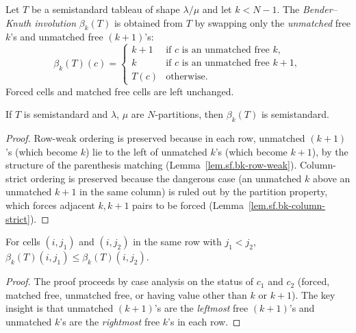 \begin{definition}
\label{def.sf.bk-involution}
\leanhelper
\leanok
Let $T$ be a semistandard tableau of shape $\lambda/\mu$ and let
$k < N-1$.  The \emph{Bender--Knuth involution} $\beta_k(T)$ is obtained
from $T$ by swapping only the \emph{unmatched} free $k$'s and
unmatched free $(k{+}1)$'s:
\[
  \beta_k(T)(c) = \begin{cases}
    k+1 & \text{if } c \text{ is an unmatched free } k, \\
    k   & \text{if } c \text{ is an unmatched free } k{+}1, \\
    T(c) & \text{otherwise.}
  \end{cases}
\]
Forced cells and matched free cells are left unchanged.
\end{definition}

\begin{lemma}
\label{lem.sf.bk-semistandard}
\leanhelper
\leanok
If $T$ is semistandard and $\lambda$, $\mu$ are $N$-partitions, then
$\beta_k(T)$ is semistandard.
\end{lemma}

\begin{proof}
\leanok
Row-weak ordering is preserved because in each row, unmatched $(k{+}1)$'s
(which become $k$) lie to the left of unmatched $k$'s (which become $k{+}1$),
by the structure of the parenthesis matching (Lemma~\ref{lem.sf.bk-row-weak}).
Column-strict ordering is preserved because the dangerous case
(an unmatched $k$ above an unmatched $k{+}1$ in the same column) is ruled out
by the partition property, which forces adjacent $k, k{+}1$ pairs to be forced
(Lemma~\ref{lem.sf.bk-column-strict}).
\end{proof}

\begin{lemma}
\label{lem.sf.bk-row-weak}
\leanhelper
\leanok
For cells $(i, j_1)$ and $(i, j_2)$ in the same row with $j_1 < j_2$,
$\beta_k(T)(i, j_1) \leq \beta_k(T)(i, j_2)$.
\end{lemma}

\begin{proof}
\leanok
The proof proceeds by case analysis on the status of $c_1$ and $c_2$
(forced, matched free, unmatched free, or having value other than $k$ or $k{+}1$).
The key insight is that unmatched $(k{+}1)$'s are the \emph{leftmost} free
$(k{+}1)$'s and unmatched $k$'s are the \emph{rightmost} free $k$'s in each row.
\end{proof}

